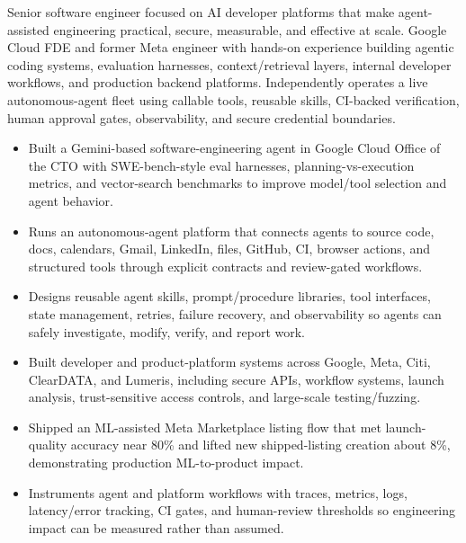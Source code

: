 


Senior software engineer focused on AI developer platforms that make agent-assisted engineering practical, secure, measurable, and effective at scale. Google Cloud FDE and former Meta engineer with hands-on experience building agentic coding systems, evaluation harnesses, context/retrieval layers, internal developer workflows, and production backend platforms. Independently operates a live autonomous-agent fleet using callable tools, reusable skills, CI-backed verification, human approval gates, observability, and secure credential boundaries.
\begin{itemize}
  \item Built a Gemini-based software-engineering agent in Google Cloud Office of the CTO with SWE-bench-style eval harnesses, planning-vs-execution metrics, and vector-search benchmarks to improve model/tool selection and agent behavior.
  \item Runs an autonomous-agent platform that connects agents to source code, docs, calendars, Gmail, LinkedIn, files, GitHub, CI, browser actions, and structured tools through explicit contracts and review-gated workflows.
  \item Designs reusable agent skills, prompt/procedure libraries, tool interfaces, state management, retries, failure recovery, and observability so agents can safely investigate, modify, verify, and report work.
\end{itemize}
\begin{itemize}
  \item Built developer and product-platform systems across Google, Meta, Citi, ClearDATA, and Lumeris, including secure APIs, workflow systems, launch analysis, trust-sensitive access controls, and large-scale testing/fuzzing.
  \item Shipped an ML-assisted Meta Marketplace listing flow that met launch-quality accuracy near 80\% and lifted new shipped-listing creation about 8\%, demonstrating production ML-to-product impact.
  \item Instruments agent and platform workflows with traces, metrics, logs, latency/error tracking, CI gates, and human-review thresholds so engineering impact can be measured rather than assumed.
\end{itemize}




